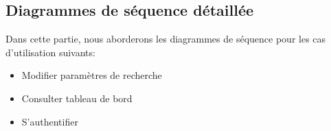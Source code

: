 \subsection{Diagrammes de séquence détaillée}
\noindent
Dans cette partie, nous aborderons les diagrammes de séquence pour les cas
d'utilisation suivants:
\begin{itemize}
	\item Modifier paramètres de recherche
	\item Consulter tableau de bord
	\item S'authentifier
\end{itemize}


